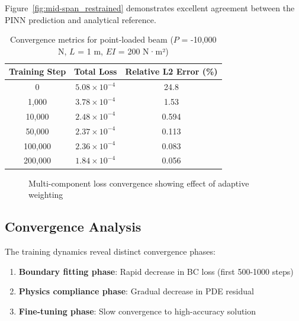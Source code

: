 \documentclass[12pt]{article}
\begin{document}
Figure~\ref{fig:mid-span_restrained} demonstrates excellent agreement between the PINN prediction and analytical reference.

\begin{table}[htbp]
\centering
\begin{tabular}{c c c}
\toprule
\textbf{Training Step} & \textbf{Total Loss} & \textbf{Relative L2 Error (\%)} \\
\midrule
0 & $5.08 \times 10^{-4}$ & 24.8 \\
1,000 & $3.78 \times 10^{-4}$ & 1.53 \\
10,000 & $2.48 \times 10^{-4}$ & 0.594 \\
50,000 & $2.37 \times 10^{-4}$ & 0.113 \\
100,000 & $2.36 \times 10^{-4}$ & 0.083 \\
200,000 & $1.84 \times 10^{-4}$ & 0.056 \\
\bottomrule
\end{tabular}
\caption{Convergence metrics for point-loaded beam ($P$ = -10,000 N, $L$ = 1 m, $EI$ = 200 N·m²)}
\label{tab:point_convergence}
\end{table}

\begin{figure}[htbp]
\centering
{}
\caption{Multi-component loss convergence showing effect of adaptive weighting}
\label{fig:point_convergence}
\end{figure}

\subsection{Convergence Analysis}
The training dynamics reveal distinct convergence phases:
\begin{enumerate}
    \item \textbf{Boundary fitting phase}: Rapid decrease in BC loss (first 500-1000 steps)
    \item \textbf{Physics compliance phase}: Gradual decrease in PDE residual
    \item \textbf{Fine-tuning phase}: Slow convergence to high-accuracy solution
\end{enumerate}
\end{document}
